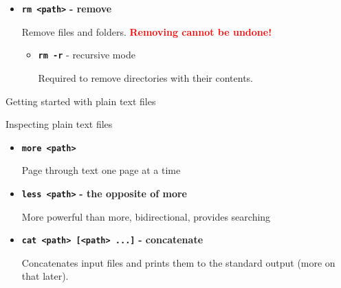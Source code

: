 \documentclass[aspectratio=1610]{beamer}
\newcommand\curtitle{}
\newcommand\command[1]{\alert{\textbf{\texttt{#1}}}}
\begin{document}

\begin{frame}[c]{\curtitle}
    \begin{itemize}[<+->]
        \setlength\itemsep{1em}
        \item \command{rm <path>} \textbf{- remove} 

            Remove files and folders. \textcolor{red}{\textbf{Removing cannot be undone!}}
            \begin{itemize}[<.->]
                \item \command{rm -r} - recursive mode

                    Required to remove directories with their contents.
            \end{itemize}
    \end{itemize}
\end{frame}


\begin{frame}[c]
    \Huge Getting started with plain text files
\end{frame}

\renewcommand\curtitle{Inspecting plain text files}

\begin{frame}[c]{\curtitle}
    \begin{itemize}[<+->]
        \setlength\itemsep{1em}
        \item \command{more <path>}

            Page through text one page at a time
        \item \command{less <path>} \textbf{- the opposite of more}

            More powerful than more, bidirectional, provides searching
        \item \command{cat <path> [<path> ...]} \textbf{- concatenate}

            Concatenates input files and prints them to the standard output (more on that later).
    \end{itemize}
\end{frame}

\end{document}
